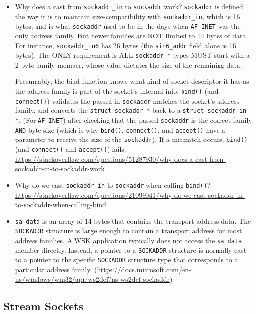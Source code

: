\begin{itemize}
\item Why does a cast from \texttt{sockaddr\_in} to \texttt{sockaddr} work?
  \texttt{sockaddr} is defined the way it is to maintain size-compatibility with
  \texttt{sockaddr\_in}, which is 16 bytes, and is what \texttt{sockaddr} used to be in
  the days when \texttt{AF\_INET} was the only address family. But newer families are NOT
  limited to 14 bytes of data. For instance, \texttt{sockaddr\_in6} has 26 bytes (the
  \texttt{sin6\_addr} field alone is 16 bytes). The ONLY requirement is ALL
  \texttt{sockaddr\_*} types MUST start with a 2-byte family member, whose value dictates
  the size of the remaining data.

  Presumably, the bind function knows what kind of socket descriptor it has as the address
  family is part of the socket's internal info. \texttt{bind()} (and \texttt{connect()})
  validates the passed in \texttt{sockaddr} matches the socket's address family, and
  converts the \texttt{struct sockaddr *} back to a \texttt{struct sockaddr\_in *}. (For
  \texttt{AF\_INET}) after checking that the passed \texttt{sockaddr} is the correct
  family \texttt{AND} byte size (which is why \texttt{bind()}, \texttt{connect()}, and
  \texttt{accept()} have a parameter to receive the size of the \texttt{sockaddr}). If a
  mismatch occurs, \texttt{bind()} (and \texttt{connect()} and \texttt{accept()}) fails.
  \url{https://stackoverflow.com/questions/51287930/why-does-a-cast-from-sockaddr-in-to-sockaddr-work}
\item Why do we cast \texttt{sockaddr\_in} to \texttt{sockaddr} when calling \texttt{bind()}?  \url{https://stackoverflow.com/questions/21099041/why-do-we-cast-sockaddr-in-to-sockaddr-when-calling-bind}
\item \texttt{sa\_data} is an array of 14 bytes that contains the transport address
  data. The \texttt{SOCKADDR} structure is large enough to contain a transport address for
  most address families. A WSK application typically does not access the \texttt{sa\_data}
  member directly. Instead, a pointer to a \texttt{SOCKADDR} structure is normally cast to
  a pointer to the specific \texttt{SOCKADDR} structure type that corresponds to a
  particular address family.
  (\url{https://docs.microsoft.com/en-us/windows/win32/api/ws2def/ns-ws2def-sockaddr})
\end{itemize}

\subsection{Stream Sockets}
\label{sec:stream-sockets}

